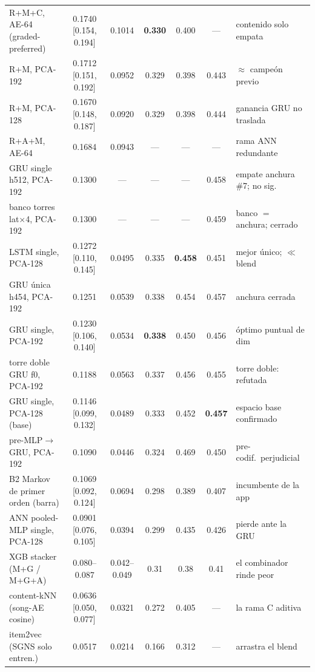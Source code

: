\documentclass[11pt]{article}
\newcommand{\best}[1]{\textbf{#1}}
\begin{document}
\begin{table}[ht]
{\begin{tabular}{lcccccl}
    R+M+C, AE-64 (graded-preferred)       & 0.1740 [0.154, 0.194] & 0.1014 & \best{0.330} & 0.400 & --- & contenido solo empata \\
    R+M, PCA-192                          & 0.1712 [0.151, 0.192] & 0.0952 & 0.329 & 0.398 & 0.443 & $\approx$ campeón previo \\
    R+M, PCA-128                          & 0.1670 [0.148, 0.187] & 0.0920 & 0.329 & 0.398 & 0.444 & ganancia GRU no traslada \\
    R+A+M, AE-64                          & 0.1684 & 0.0943 & --- & --- & --- & rama ANN redundante \\
    GRU single h512, PCA-192          & 0.1300 & --- & --- & --- & 0.458 & empate anchura \#7; no sig.\ \\
    banco torres lat$\times$4, PCA-192 & 0.1300 & --- & --- & --- & 0.459 & banco $=$ anchura; cerrado \\
    LSTM single, PCA-128                  & 0.1272 [0.110, 0.145] & 0.0495 & 0.335 & \best{0.458} & 0.451 & mejor único; $\ll$ blend \\
    GRU única h454, PCA-192           & 0.1251 & 0.0539 & 0.338 & 0.454 & 0.457 & anchura cerrada \\
    GRU single, PCA-192                   & 0.1230 [0.106, 0.140] & 0.0534 & \best{0.338} & 0.450 & 0.456 & óptimo puntual de dim \\
    torre doble GRU f0, PCA-192       & 0.1188 & 0.0563 & 0.337 & 0.456 & 0.455 & torre doble: refutada \\
    GRU single, PCA-128 (base)            & 0.1146 [0.099, 0.132] & 0.0489 & 0.333 & 0.452 & \best{0.457} & espacio base confirmado \\
    pre-MLP$\to$GRU, PCA-192          & 0.1090 & 0.0446 & 0.324 & 0.469 & 0.450 & pre-codif.\ perjudicial \\
    B2 Markov de primer orden (barra)     & 0.1069 [0.092, 0.124] & 0.0694 & 0.298 & 0.389 & 0.407 & incumbente de la app \\
    ANN pooled-MLP single, PCA-128        & 0.0901 [0.076, 0.105] & 0.0394 & 0.299 & 0.435 & 0.426 & pierde ante la GRU \\
    XGB stacker (M+G / M+G+A)             & 0.080--0.087 & 0.042--0.049 & 0.31 & 0.38 & 0.41 & el combinador rinde peor \\
    content-kNN (song-AE cosine)          & 0.0636 [0.050, 0.077] & 0.0321 & 0.272 & 0.405 & --- & la rama C aditiva \\
    item2vec (SGNS solo entren.)          & 0.0517 & 0.0214 & 0.166 & 0.312 & --- & arrastra el blend \\
    \bottomrule
  \end{tabular}}
\end{table}
\end{document}
